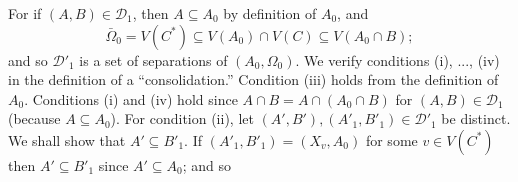 For if $(A, B) \in \mathcal{D}_1$, then $A \subseteq A_0$ by definition of $A_0$, and
\begin{equation*}
\bar{\Omega}_0 = V(C^*) \subseteq V(A_0) \cap V(C) \subseteq V(A_0 \cap B);
\end{equation*}
and so $\mathcal{D}'_1$ is a set of separations of $(A_0, \Omega_0)$. We verify conditions (i), ..., (iv) in the definition of a ``consolidation.'' Condition (iii) holds from the definition of $A_0$. Conditions (i) and (iv) hold since $A \cap B = A \cap (A_0 \cap B)$ for $(A, B) \in \mathcal{D}_1$ (because $A \subseteq A_0$). For condition (ii), let $(A', B'), (A'_1, B'_1) \in \mathcal{D}'_1$ be distinct. We shall show that $A' \subseteq B'_1$. If $(A'_1, B'_1) = (X_v, A_0)$ for some $v \in V(C^*)$ then $A' \subseteq B'_1$ since $A' \subseteq A_0$; and so
